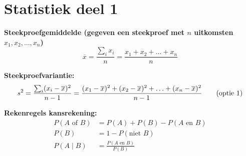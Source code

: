 \vspace{-2cm}
\section*{Statistiek deel 1}
\textbf{Steekproefgemiddelde (gegeven een steekproef met $n$ uitkomsten $x_1, x_2, \ldots, x_n$)}
\[
    \overline{x} = \frac{\sum_{i} x_i}{n} = \frac{x_1 + x_2 + \ldots + x_n}{n}
\]

\textbf{Steekproefvariantie:}
\begin{align*}
    s^2 &= \frac{\sum_{i} (x_i-\overline{x})^2}{n-1} = \frac{(x_1-\overline{x})^2 + (x_2-\overline{x})^2 + \ldots + (x_n - \overline{x})^2}{n-1} \hfill \tag{optie 1} \\%
\end{align*}

\textbf{Rekenregels kansrekening:}
\begin{align*}
    P(A \text{ of } B)      &= P(A) + P(B) - P(A \text{ en } B) \tag{optelregel}\\
    P(B)                    &= 1 - P(\text{niet } B) \tag{complementregel}\\
    P(A \mid B)         &= \frac{P(A \text{ en } B)}{P(B)} \tag{conditionele kansen}
\end{align*}

